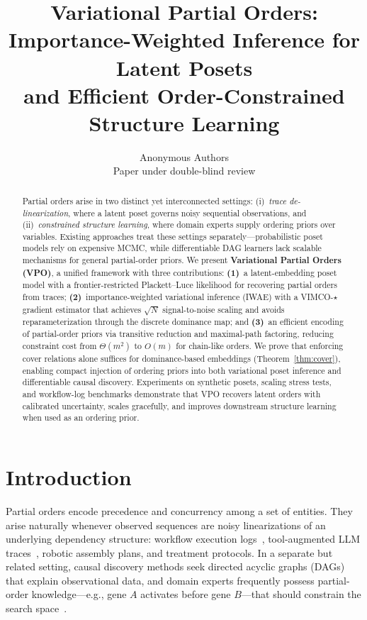 \documentclass{article}
\title{Variational Partial Orders:\\Importance-Weighted Inference for Latent Posets\\
and Efficient Order-Constrained Structure Learning}
\author{
  Anonymous Authors\\
  Paper under double-blind review
}
\theoremstyle{definition}
\theoremstyle{remark}
\begin{document}
\maketitle

\begin{abstract}
Partial orders arise in two distinct yet interconnected settings:
(i)~\emph{trace de-linearization}, where a latent poset governs noisy sequential
observations, and (ii)~\emph{constrained structure learning}, where domain experts
supply ordering priors over variables.
Existing approaches treat these settings separately---probabilistic poset models
rely on expensive MCMC, while differentiable DAG learners lack scalable mechanisms
for general partial-order priors.
We present \textbf{Variational Partial Orders (VPO)}, a unified framework with
three contributions:
\textbf{(1)}~a latent-embedding poset model with a frontier-restricted
Plackett--Luce likelihood for recovering partial orders from traces;
\textbf{(2)}~importance-weighted variational inference (IWAE) with a
VIMCO-$\star$ gradient estimator that achieves $\sqrt{N}$
signal-to-noise scaling and avoids reparameterization through the
discrete dominance map;
and \textbf{(3)}~an efficient encoding of partial-order priors via transitive
reduction and maximal-path factoring, reducing constraint cost from
$\Theta(m^2)$ to $O(m)$ for chain-like orders.
We prove that enforcing cover relations alone suffices for dominance-based
embeddings (Theorem~\ref{thm:cover}), enabling compact injection of ordering
priors into both variational poset inference and differentiable causal discovery.
Experiments on synthetic posets, scaling stress tests, and workflow-log benchmarks
demonstrate that VPO recovers latent orders with calibrated uncertainty, scales
gracefully, and improves downstream structure learning when used as an ordering prior.
\end{abstract}

\section{Introduction}
\label{sec:intro}

Partial orders encode precedence and concurrency among a set of entities.
They arise naturally whenever observed sequences are noisy linearizations of
an underlying dependency structure: workflow execution
logs~\citep{vanderaalst2016process}, tool-augmented LLM
traces~\citep{yao2023react,schick2024toolformer}, robotic assembly plans,
and treatment protocols.
In a separate but related setting, causal discovery methods seek directed
acyclic graphs (DAGs) that explain observational data, and domain experts
frequently possess partial-order knowledge---e.g., gene $A$ activates before
gene $B$---that should constrain the search
space~\citep{pearl2009causality,spirtes2001causation}.
\end{document}
